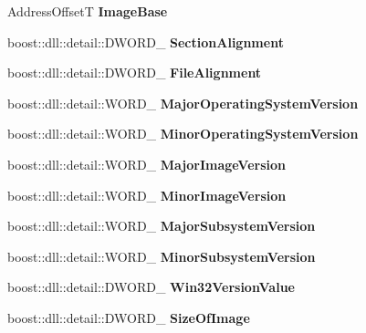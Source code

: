 \begin{DoxyCompactItemize}
\begin{tabbing}
\end{tabbing}\item 
\mbox{\label{a01608_aaa98c9194f6cfdc737ea18c5047df18a}} 
Address\+OffsetT {\bfseries Image\+Base}
\item 
\mbox{\label{a01608_a95afdf2ff8a21293d7baad2931e92c15}} 
boost\+::dll\+::detail\+::\+D\+W\+O\+R\+D\+\_\+ {\bfseries Section\+Alignment}
\item 
\mbox{\label{a01608_a21fce43504dc1eb8437cf5bd8e04a288}} 
boost\+::dll\+::detail\+::\+D\+W\+O\+R\+D\+\_\+ {\bfseries File\+Alignment}
\item 
\mbox{\label{a01608_a846d83f8a021d3746748d3f6b23a8e45}} 
boost\+::dll\+::detail\+::\+W\+O\+R\+D\+\_\+ {\bfseries Major\+Operating\+System\+Version}
\item 
\mbox{\label{a01608_a8a1a7bbb7b06ac2120cfdc09463cd1a7}} 
boost\+::dll\+::detail\+::\+W\+O\+R\+D\+\_\+ {\bfseries Minor\+Operating\+System\+Version}
\item 
\mbox{\label{a01608_aa237f87b050f32f576c88cb8d2400584}} 
boost\+::dll\+::detail\+::\+W\+O\+R\+D\+\_\+ {\bfseries Major\+Image\+Version}
\item 
\mbox{\label{a01608_a01dd0be3073b05ec638603a048e6f81d}} 
boost\+::dll\+::detail\+::\+W\+O\+R\+D\+\_\+ {\bfseries Minor\+Image\+Version}
\item 
\mbox{\label{a01608_a6798cbb9208df874e7a93ae809a46ca1}} 
boost\+::dll\+::detail\+::\+W\+O\+R\+D\+\_\+ {\bfseries Major\+Subsystem\+Version}
\item 
\mbox{\label{a01608_a56a7cb9654b540992637db37d557220e}} 
boost\+::dll\+::detail\+::\+W\+O\+R\+D\+\_\+ {\bfseries Minor\+Subsystem\+Version}
\item 
\mbox{\label{a01608_aff33191e6a81cb86fcc6e4b74c35bc02}} 
boost\+::dll\+::detail\+::\+D\+W\+O\+R\+D\+\_\+ {\bfseries Win32\+Version\+Value}
\item 
\mbox{\label{a01608_a2364a207793f55634d51b18b7d4f902e}} 
boost\+::dll\+::detail\+::\+D\+W\+O\+R\+D\+\_\+ {\bfseries Size\+Of\+Image}

\end{DoxyCompactItemize}
